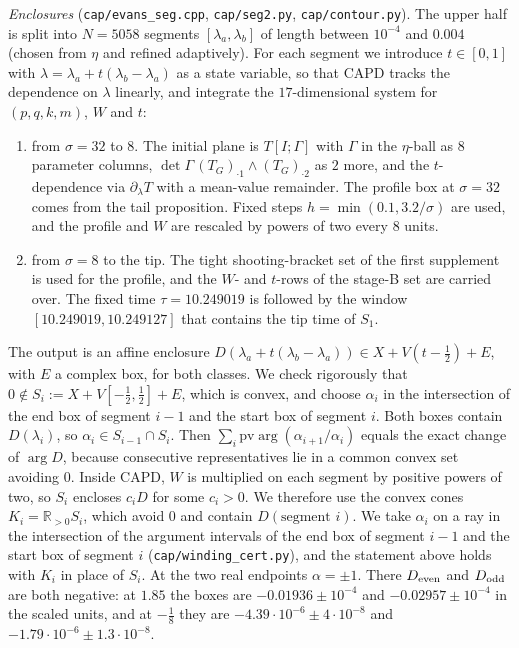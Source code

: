 \documentclass[11pt]{amsart}
\theoremstyle{remark}
\newcommand{\R}{\mathbb{R}}
\begin{document}
\emph{Enclosures} (\texttt{cap/evans\_seg.cpp}, \texttt{cap/seg2.py}, \texttt{cap/contour.py}). The upper half is split into $N=5058$ segments $[\lambda_a,\lambda_b]$ of length between $10^{-4}$ and $0.004$ (chosen from $\eta$ and refined adaptively). For each segment we introduce $t\in[0,1]$ with $\lambda=\lambda_a+t(\lambda_b-\lambda_a)$ as a state variable, so that CAPD tracks the dependence on $\lambda$ linearly, and integrate the $17$-dimensional system for $(p,q,k,m)$, $W$ and $t$:
\begin{enumerate}
\item[(B)] from $\sigma=32$ to $8$. The initial plane is $T[I;\Gamma]$ with $\Gamma$ in the $\eta$-ball as $8$ parameter columns, $\det\Gamma\,(T_G)_{\cdot1}\wedge(T_G)_{\cdot2}$ as $2$ more, and the $t$-dependence via $\partial_\lambda T$ with a mean-value remainder. The profile box at $\sigma=32$ comes from the tail proposition. Fixed steps $h=\min(0.1,3.2/\sigma)$ are used, and the profile and $W$ are rescaled by powers of two every $8$ units.
\item[(C)] from $\sigma=8$ to the tip. The tight shooting-bracket set of the first supplement is used for the profile, and the $W$- and $t$-rows of the stage-B set are carried over. The fixed time $\tau=10.249019$ is followed by the window $[10.249019,10.249127]$ that contains the tip time of $S_1$.
\end{enumerate}
The output is an affine enclosure $D(\lambda_a+t(\lambda_b-\lambda_a))\in X+V(t-\frac12)+E$, with $E$ a complex box, for both classes. We check rigorously that $0\notin S_i:=X+V[-\frac12,\frac12]+E$, which is convex, and choose $\alpha_i$ in the intersection of the end box of segment $i-1$ and the start box of segment $i$. Both boxes contain $D(\lambda_i)$, so $\alpha_i\in S_{i-1}\cap S_i$. Then $\sum_i\mathrm{pv}\arg(\alpha_{i+1}/\alpha_i)$ equals the exact change of $\arg D$, because consecutive representatives lie in a common convex set avoiding $0$. Inside CAPD, $W$ is multiplied on each segment by positive powers of two, so $S_i$ encloses $c_iD$ for some $c_i>0$. We therefore use the convex cones $K_i=\R_{>0}S_i$, which avoid $0$ and contain $D(\text{segment }i)$. We take $\alpha_i$ on a ray in the intersection of the argument intervals of the end box of segment $i-1$ and the start box of segment $i$ (\texttt{cap/winding\_cert.py}), and the statement above holds with $K_i$ in place of $S_i$. At the two real endpoints $\alpha=\pm1$. There $D_{\rm even}$ and $D_{\rm odd}$ are both negative: at $1.85$ the boxes are $-0.01936\pm10^{-4}$ and $-0.02957\pm10^{-4}$ in the scaled units, and at $-\frac18$ they are $-4.39\cdot10^{-6}\pm4\cdot10^{-8}$ and $-1.79\cdot10^{-6}\pm1.3\cdot10^{-8}$.
\end{document}
